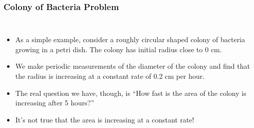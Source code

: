 \documentclass[serif,ignorenonframetext]{beamer}
\begin{document}
\begin{frame}
  \frametitle{Colony of Bacteria Problem}
  \begin{columns}
  \begin{itemize}[<+->]
  \item As a simple example, consider a roughly circular shaped
    colony of bacteria growing in a petri dish.  The colony has
    initial radius close to $0$ cm.
  \item We make periodic measurements of the diameter of the colony
    and find that the radius is increasing at a constant rate
    of 0.2 cm per hour.
  \item The real question we have, though, is ``How fast is the area
    of the colony is increasing after 5 hours?''
  \item It's not true that the area is increasing at a constant rate!
  \end{itemize}

\end{columns}
\end{frame}
\end{document}
